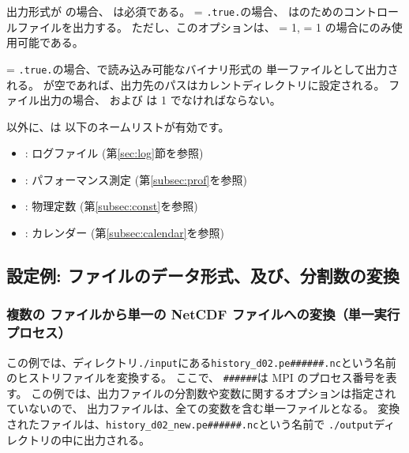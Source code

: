 出力形式が \scalenetcdf の場合、 は必須である。
 = \verb|.true.|の場合、
\sno は{\grads}のためのコントロールファイルを出力する。
ただし、このオプションは、 = 1,  = 1 の場合にのみ使用可能である。



 = \verb|.true.|の場合、\grads で読み込み可能なバイナリ形式の
単一ファイルとして出力される。
が空であれば、出力先のパスはカレントディレクトリに設定される。
\grads ファイル出力の場合、 および  は 1 でなければならない。



以外に、\sno は 以下のネームリストが有効です。
%
\begin{itemize}
 \item {}: ログファイル (第\ref{sec:log}節を参照)
 \item {}: パフォーマンス測定 (第\ref{subsec:prof}を参照)
 \item {}: 物理定数 (第\ref{subsec:const}を参照)
 \item {}: カレンダー (第\ref{subsec:calendar}を参照)
\end{itemize}



\subsection{設定例: ファイルのデータ形式、及び、分割数の変換}

\subsubsection{複数の \scalenetcdf ファイルから単一の NetCDF ファイルへの変換（単一実行プロセス）}
%
%
この例では、ディレクトリ\verb|./input|にある\verb|history_d02.pe######.nc|という名前のヒストリファイルを変換する。
ここで、 \verb|######|は MPI のプロセス番号を表す。
この例では、出力ファイルの分割数や変数に関するオプションは指定されていないので、
出力ファイルは、全ての変数を含む単一ファイルとなる。
変換されたファイルは、\verb|history_d02_new.pe######.nc|という名前で \verb|./output|ディレクトリの中に出力される。


